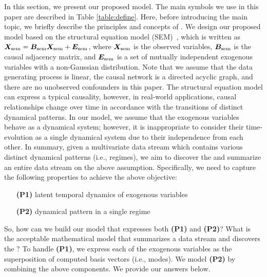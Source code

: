 \TSK{

}
\TSK{

}
In this section, we present our proposed model.
The main symbols we use in this paper are described in
Table \ref{table:define}.
Here,
before introducing the main topic,
we briefly describe the principles and concepts of \method.
We design our proposed model based on the structural equation model (SEM)~\cite{pearl2009causality},
which is written as $\bm{X}_{\text{sem}} = \bm{B}_{\text{sem}}\bm{X}_{\text{sem}} + \bm{E}_{\text{sem}}$,
where $\bm{X}_{\text{sem}}$ is the observed variables,
$\bm{B}_{\text{sem}}$ is the causal adjacency matrix, and
$\bm{E}_{\text{sem}}$ is a set of mutually independent exogenous variables with a non-Gaussian distribution.
Note that we assume that
the data generating process is linear,
the causal network is a directed acyclic graph, and
there are no unobserved confounders in this paper.
The structural equation model can express a typical causality,
however, in real-world applications,
causal relationships change over time
in accordance with the transitions of distinct dynamical patterns.
In our model, we assume that the exogenous variables behave as a dynamical system;
however, it is inappropriate to consider
their time-evolution
as a single dynamical system
due to their independence from each other.
In summary, given a multivariate data stream
which contains various distinct dynamical patterns (i.e., regimes),
we aim to discover the \relation and summarize an entire data stream on the above assumption.
Specifically, we need to capture the following properties
to achieve
the above objective:
\begin{itemize}
    \item [\textbf{(P1)}] latent temporal dynamics of exogenous variables
    \item [\textbf{(P2)}] dynamical pattern in a single regime
\end{itemize}
So, how can we build our model that expresses both \textbf{(P1)} and \textbf{(P2)}?
What is the acceptable mathematical model that summarizes a data stream and discovers the \relation?
To handle \textbf{(P1)}, we express each of the exogenous variables as the superposition of computed basis vectors (i.e., modes).
We model \textbf{(P2)} by combining the above components.
We provide our answers below.
